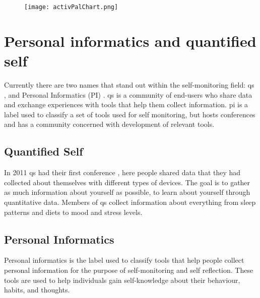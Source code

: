 \begin{figure}[h!]
	\centering
		\texttt{[image: activPalChart.png]}
		\caption{\footnotesize }
		\label{fig:activPalActivityBreakdown}
\end{figure}

\section{Personal informatics and quantified self}
Currently there are two names that stand out within the self-monitoring field: \gls{qs} \cite{quantifiedSelf}, and Personal Informatics (PI) \cite{personalInformatics}. \gls{qs} is a community of end-users who share data and exchange experiences with tools that help them collect information. \gls{pi} is a label used to classify a set of tools used for self monitoring, but hosts conferences and has a community concerned with development of relevant tools.

\subsection{Quantified Self}
In 2011 \gls{qs} had their first conference \cite{bodyHackers}, here people shared data that they had collected about themselves with different types of devices. The goal is to gather as much information about yourself as possible, to learn about yourself through quantitative data. Members of \gls{qs} collect information about everything from sleep patterns and diets to mood and stress levels.



\subsection{Personal Informatics}
Personal informatics is the label used to classify tools that help people collect personal information for the purpose of self-monitoring and self reflection. These tools are used to help individuals gain self-knowledge about their behaviour, habits, and thoughts.

